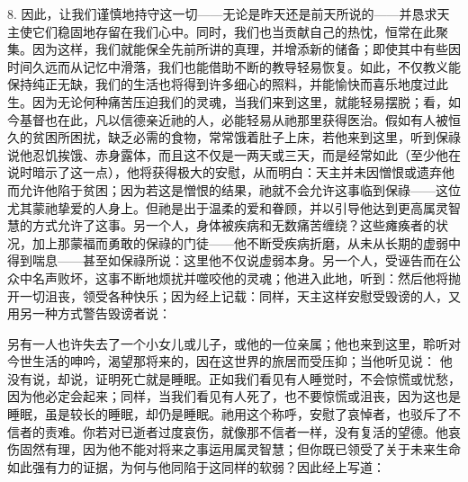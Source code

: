 8. 因此，让我们谨慎地持守这一切——无论是昨天还是前天所说的——并恳求天主使它们稳固地存留在我们心中。同时，我们也当贡献自己的热忱，恒常在此聚集。因为这样，我们就能保全先前所讲的真理，并增添新的储备；即使其中有些因时间久远而从记忆中滑落，我们也能借助不断的教导轻易恢复。如此，不仅教义能保持纯正无缺，我们的生活也将得到许多细心的照料，并能愉快而喜乐地度过此生。因为无论何种痛苦压迫我们的灵魂，当我们来到这里，就能轻易摆脱；看，如今基督也在此，凡以信德亲近祂的人，必能轻易从祂那里获得医治。假如有人被恒久的贫困所困扰，缺乏必需的食物，常常饿着肚子上床，若他来到这里，听到保祿说他忍饥挨饿、赤身露体，而且这不仅是一两天或三天，而是经常如此（至少他在说时暗示了这一点），他将获得极大的安慰，从而明白：天主并未因憎恨或遗弃他而允许他陷于贫困；因为若这是憎恨的结果，祂就不会允许这事临到保祿——这位尤其蒙祂挚爱的人身上。但祂是出于温柔的爱和眷顾，并以引导他达到更高属灵智慧的方式允许了这事。另一个人，身体被疾病和无数痛苦缠绕？这些瘫痪者的状况，加上那蒙福而勇敢的保祿的门徒——他不断受疾病折磨，从未从长期的虚弱中得到喘息——甚至如保祿所说：这里他不仅说虚弱本身。另一个人，受诬告而在公众中名声败坏，这事不断地烦扰并噬咬他的灵魂；他进入此地，听到：然后他将抛开一切沮丧，领受各种快乐；因为经上记载：同样，天主这样安慰受毁谤的人，又用另一种方式警告毁谤者说：\par

另有一人也许失去了一个小女儿或儿子，或他的一位亲属；他也来到这里，聆听对今世生活的呻吟，渴望那将来的，因在这世界的旅居而受压抑；当他听见说： 他没有说，却说，证明死亡就是睡眠。正如我们看见有人睡觉时，不会惊慌或忧愁，因为他必定会起来；同样，当我们看见有人死了，也不要惊慌或沮丧，因为这也是睡眠，虽是较长的睡眠，却仍是睡眠。祂用这个称呼，安慰了哀悼者，也驳斥了不信者的责难。你若对已逝者过度哀伤，就像那不信者一样，没有复活的望德。他哀伤固然有理，因为他不能对将来之事运用属灵智慧；但你既已领受了关于未来生命如此强有力的证据，为何与他同陷于这同样的软弱？因此经上写道：\par

